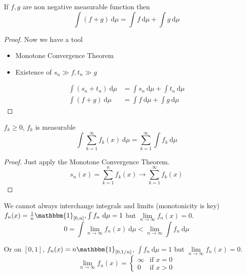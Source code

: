\begin{lemma}
  If $f, g$ are non negative measurable function then 
  \[\int (f+g)\ \mathrm{d}\mu = \int f\ \mathrm{d}\mu + \int g\ \mathrm{d}\mu\]
\end{lemma}

\begin{proof}
  Now we have a tool \begin{itemize}
    \item Monotone Convergence Theorem
    \item Existence of $s_n\gg f, t_n \gg g$
  \end{itemize}
  \begin{align*}
    \int (s_n + t_n)\ \mathrm{d}\mu &= \int s_n\ \mathrm{d}\mu + \int t_n\ \mathrm{d}\mu \\
    \int (f + g)\ \mathrm{d}\mu &= \int f\ \mathrm{d}\mu + \int g\ \mathrm{d}\mu
  \end{align*}
\end{proof}

\begin{lemma}
$f_k \ge 0$, $f_k$ is measurable
$$\int \sum_{k=1}^\infty f_k(x)\ \mathrm{d}\mu = \sum_{k=1}^\infty\int f_k \ \mathrm{d}\mu$$
\end{lemma}

\begin{proof}
  Just apply the Monotone Convergence Theorem.
  \[s_n(x) = \sum_{k=1}^n f_k(x) \to \sum_{k=1}^\infty f_k(x)\]
\end{proof}

\begin{remark}
We cannot always interchange integrals and limits (monotonicity is key)
$f_n(x) = \frac1n\mathbbm{1}_{[0, n]}, \int f_n\ \mathrm{d}\mu = 1$ 
but $\lim\limits_{n\to\infty}f_n(x) = 0$.
\[0 = \int \lim_{n\to \infty} f_n(x)\ \mathrm{d}\mu < \lim_{n\to\infty}\int f_n\ \mathrm{d}\mu\]

Or on $[0, 1]$, $f_n(x) = n\mathbbm{1}_{[0, 1/n]}$, $\int f_n\ \mathrm{d}\mu = 1$ but $\lim\limits_{n\to\infty}f_n(x) = 0$. 
$$\lim\limits_{n\to\infty}f_n(x) = \begin{cases}
  \infty & \text{if } x = 0 \\ 
  0 & \text{if } x > 0
\end{cases}$$
\end{remark}
  
